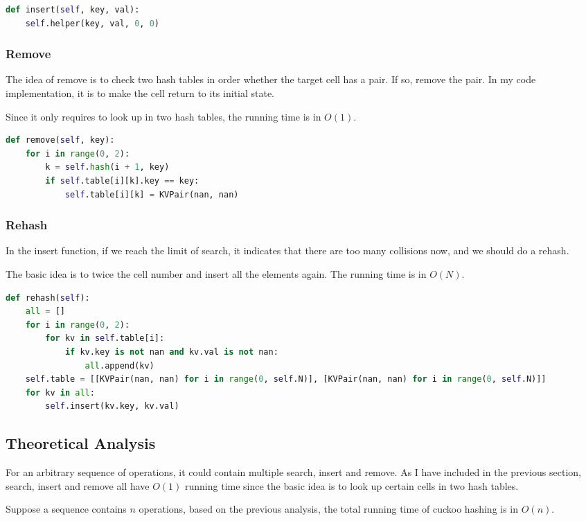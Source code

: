 \documentclass{article}
\begin{document}
\begin{spacing}{1.2}
\begin{lstlisting}[language=Python]
def insert(self, key, val):
    self.helper(key, val, 0, 0)
\end{lstlisting}

\subsubsection{Remove}
The idea of remove is to check two hash tables in order whether the target cell has a pair. If so, remove the pair. In my code implementation, it is to make the cell return to its initial state. 

Since it only requires to look up in two hash tables, the running time is in $O(1)$.
\begin{lstlisting}[language=Python]
def remove(self, key):
    for i in range(0, 2):
        k = self.hash(i + 1, key)
        if self.table[i][k].key == key:
            self.table[i][k] = KVPair(nan, nan)
\end{lstlisting}

\subsubsection{Rehash}
In the insert function, if we reach the limit of search, it indicates that there are too many collisions now, and we should do a rehash.

The basic idea is to twice the cell number and insert all the elements again. The running time is in $O(N)$.
\begin{lstlisting}[language=Python]
def rehash(self):
    all = []
    for i in range(0, 2):
        for kv in self.table[i]:
            if kv.key is not nan and kv.val is not nan:
                all.append(kv)
    self.table = [[KVPair(nan, nan) for i in range(0, self.N)], [KVPair(nan, nan) for i in range(0, self.N)]]
    for kv in all:
        self.insert(kv.key, kv.val)
\end{lstlisting}

\subsection{Theoretical Analysis}
For an arbitrary sequence of operations, it could contain multiple search, insert and remove. As I have included in the previous section, search, insert and remove all have $O(1)$ running time since the basic idea is to look up certain cells in two hash tables.

Suppose a sequence contains $n$ operations, based on the previous analysis, the total running time of cuckoo hashing is in $O(n)$.


\end{spacing}
\end{document}
